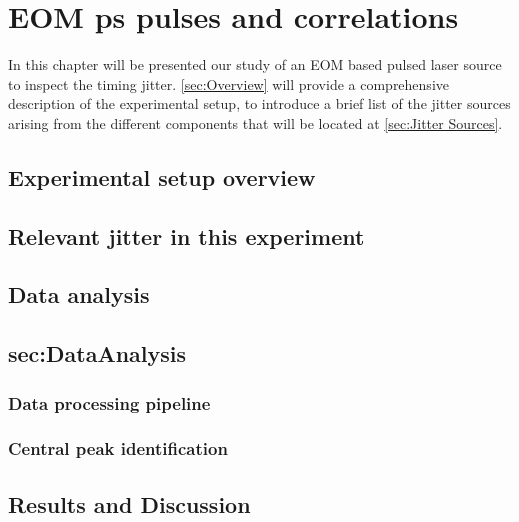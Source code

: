 \chapter{EOM ps pulses and correlations}
In this chapter will be presented our study of an EOM based pulsed laser source to inspect the timing jitter.
\autoref{sec:Overview} will provide a comprehensive description of the experimental setup, to introduce a brief list of the jitter sources arising from the different components that will be located at \autoref{sec:Jitter Sources}.



\section{Experimental setup overview}
\label{sec:Overview}
\section{Relevant jitter in this experiment}
\label{sec:Jitter Sources}
\section{Data analysis}
\section{sec:DataAnalysis}
\subsection{Data processing pipeline}
\label{subsec:Pipeline}
\subsection{Central peak identification}
\label{subsec:CentralPeakId}
\section{Results and Discussion}